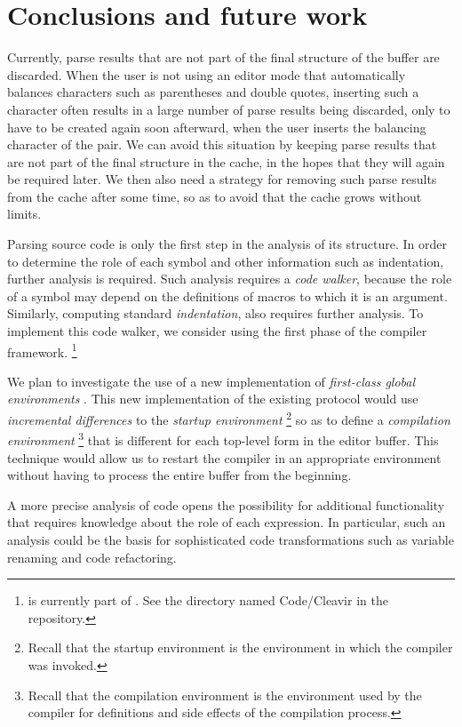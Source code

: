\section{Conclusions and future work}

Currently, parse results that are not part of the final structure of
the buffer are discarded.  When the user is not using an editor mode
that automatically balances characters such as parentheses and double
quotes, inserting such a character often results in a large number of
parse results being discarded, only to have to be created again soon
afterward, when the user inserts the balancing character of the pair.
We can avoid this situation by keeping parse results that are not part
of the final structure in the cache, in the hopes that they will again
be required later.  We then also need a strategy for removing such
parse results from the cache after some time, so as to avoid that the
cache grows without limits.

Parsing \commonlisp{} source code is only the first step in the
analysis of its structure.  In order to determine the role of each
symbol and other information such as indentation, further analysis is
required.  Such analysis requires a \emph{code walker}, because the
role of a symbol may depend on the definitions of macros to which it
is an argument.  Similarly, computing standard
\emph{indentation}, also requires further analysis.  To implement this
code walker, we consider using the first phase of the \cleavir{}
compiler framework.%
\footnote{\cleavir{} is currently part of \sicl{}.  See the directory
  named Code/Cleavir in the \sicl{} repository.}

We plan to investigate the use of a new implementation of
\emph{first-class global environments}
\cite{Strandh:2015:ELS:Environments}.  This new implementation of the
existing \clos{} protocol would use \emph{incremental differences} to
the \emph{startup environment}%
\footnote{Recall that the startup environment is the environment in
  which the compiler was invoked.}
so as to define a \emph{compilation environment}%
\footnote{Recall that the compilation environment is the environment
  used by the compiler for definitions and side effects of the
  compilation process.}
that is different for each top-level form in the editor buffer.  This
technique would allow us to restart the compiler in an appropriate
environment without having to process the entire buffer from the
beginning.

A more precise analysis of \commonlisp{} code opens the
possibility for additional functionality that requires knowledge about
the role of each expression.  In particular, such an analysis could be
the basis for sophisticated code transformations such as variable
renaming and code refactoring.
